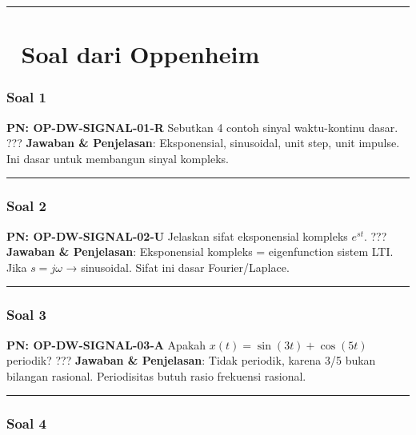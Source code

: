 \documentclass[
  letterpaper,
  DIV=11,
  numbers=noendperiod]{scrreprt}
\begin{document}
\begin{center}\rule{0.5\linewidth}{0.5pt}\end{center}


\chapter{📘 Soal dari Oppenheim}\label{soal-dari-oppenheim}

\subsection{Soal 1}\label{soal-1}

\textbf{PN: OP-DW-SIGNAL-01-R} Sebutkan 4 contoh sinyal waktu-kontinu
dasar. ??? \textbf{Jawaban \& Penjelasan}: Eksponensial, sinusoidal,
unit step, unit impulse. Ini dasar untuk membangun sinyal kompleks.

\begin{center}\rule{0.5\linewidth}{0.5pt}\end{center}

\subsection{Soal 2}\label{soal-2}

\textbf{PN: OP-DW-SIGNAL-02-U} Jelaskan sifat eksponensial kompleks
\(e^{st}\). ??? \textbf{Jawaban \& Penjelasan}: Eksponensial kompleks =
eigenfunction sistem LTI. Jika \(s=j\omega\) → sinusoidal. Sifat ini
dasar Fourier/Laplace.

\begin{center}\rule{0.5\linewidth}{0.5pt}\end{center}

\subsection{Soal 3}\label{soal-3}

\textbf{PN: OP-DW-SIGNAL-03-A} Apakah \(x(t)=\sin(3t)+\cos(5t)\)
periodik? ??? \textbf{Jawaban \& Penjelasan}: Tidak periodik, karena 3/5
bukan bilangan rasional. Periodisitas butuh rasio frekuensi rasional.

\begin{center}\rule{0.5\linewidth}{0.5pt}\end{center}

\subsection{Soal 4}\label{soal-4}
\end{document}
